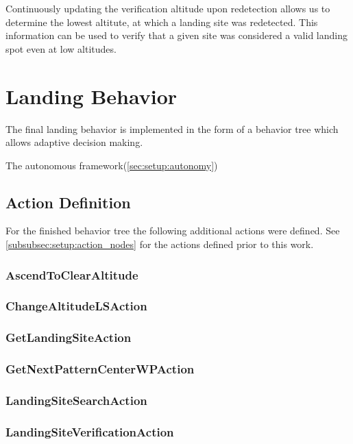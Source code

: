 Continuously updating the verification altitude upon redetection allows us to determine the lowest altitute, at which a landing site was redetected. This information can be used to verify that a given site was considered a valid landing spot even at low altitudes. 

\section{Landing Behavior}

The final landing behavior is implemented in the form of a behavior tree which allows adaptive decision making.

The autonomous framework(\ref{sec:setup:autonomy}) 

\subsection{Action Definition}

For the finished behavior tree the following additional actions were defined. See \cref{subsubsec:setup:action_nodes} for the actions defined prior to this work.

\subsubsection{AscendToClearAltitude}
\subsubsection{ChangeAltitudeLSAction}
\subsubsection{GetLandingSiteAction}
\subsubsection{GetNextPatternCenterWPAction}
\subsubsection{LandingSiteSearchAction}
\subsubsection{LandingSiteVerificationAction}
